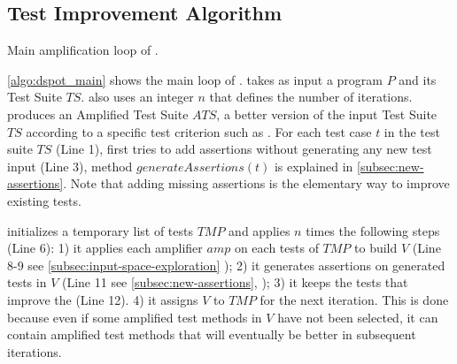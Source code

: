 \subsection{Test Improvement Algorithm}
\label{subsec:algo}

\begin{algorithm}[t]
	\begin{algorithmic}[1]
		\EndFor
		\EndFor
		\EndFor
	\end{algorithmic}
	\caption{Main amplification loop of \dspot.}
	\label{algo:dspot_main}
\end{algorithm}

\autoref{algo:dspot_main} shows the main loop of \dspot. 
\dspot takes as input a program $P$ and its Test Suite $TS$. \dspot also uses an integer $n$ that defines the number of iterations.
\dspot produces an Amplified Test Suite $ATS$, \ie a better version of the input Test Suite $TS$ according to a specific test criterion such as \ms.
For each test case $t$ in the test suite $TS$ (Line 1), \dspot first tries to add assertions without generating any new test input (Line 3),  method $generateAssertions\left(t\right)$ is explained in \autoref{subsec:new-assertions}.
Note that adding missing assertions is the elementary way to improve existing tests.

\dspot initializes a temporary list of tests $TMP$ and applies $n$ times the following steps (Line 6): 
1) it applies each amplifier $amp$ on each tests of $TMP$ to build $V$ (Line 8-9 see \autoref{subsec:input-space-exploration} \ie \Iampl);
2) it generates assertions on generated tests in $V$ (Line 11 see \autoref{subsec:new-assertions}, \ie \Aampl);
3) it keeps the tests that improve the \ms (Line 12).
4) it assigns $V$ to $TMP$ for the next iteration. This is done because even if some amplified test methods in $V$ have not been selected, it can contain amplified test methods that will eventually be better in subsequent iterations.


